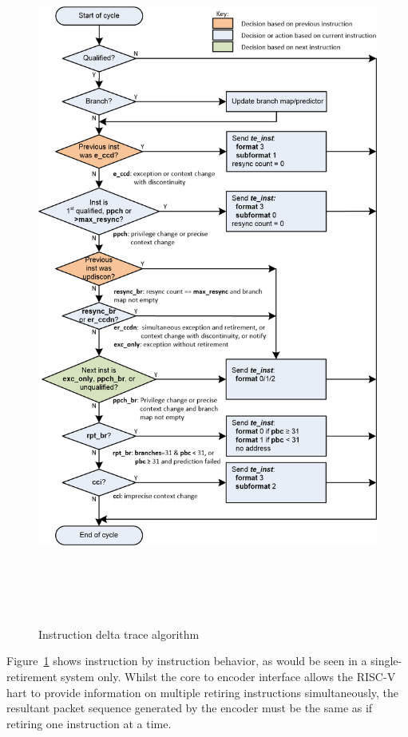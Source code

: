 \begin{figure}
\begin{center}
  \includegraphics[height=23cm, width=15cm]{algo.png}
  \caption{Instruction delta trace algorithm}
  \label{fig:algo}
\end{center}
\end{figure}

Figure~\ref{fig:algo} shows instruction by instruction behavior, as would be
seen in a single-retirement system only.  Whilst the core to encoder interface allows the 
RISC-V hart to provide information on multiple retiring instructions simultaneously, the resultant 
packet sequence generated by the encoder must be the same as if retiring one instruction at a time.

